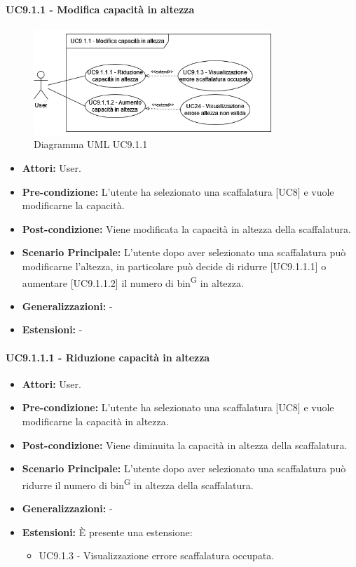 \paragraph{UC9.1.1 - Modifica capacità in altezza}
\begin{figure}[H]
  \centering
  \includegraphics[width=0.8\textwidth]{UC_diagrams_1-10/UC9.1.1.drawio.png}
   \caption{Diagramma UML UC9.1.1}
\end{figure}
\begin{itemize}
    \item \textbf{Attori:} User.
    \item \textbf{Pre-condizione:} L'utente ha selezionato una scaffalatura [UC8] e vuole modificarne la capacità.
    \item \textbf{Post-condizione:} Viene modificata la capacità in altezza della scaffalatura.
    \item \textbf{Scenario Principale:} L'utente dopo aver selezionato una scaffalatura può modificarne l'altezza, in particolare può decide di ridurre [UC9.1.1.1] o aumentare [UC9.1.1.2] il numero di bin\textsuperscript{G} in altezza.
    \item \textbf{Generalizzazioni:} -
    \item \textbf{Estensioni:} -
\end{itemize}


\paragraph{UC9.1.1.1 - Riduzione capacità in altezza}
\begin{itemize}
    \item \textbf{Attori:} User.
    \item \textbf{Pre-condizione:} L'utente ha selezionato una scaffalatura [UC8] e vuole modificarne la capacità in altezza.
    \item \textbf{Post-condizione:} Viene diminuita la capacità in altezza della scaffalatura.
    \item \textbf{Scenario Principale:} L'utente dopo aver selezionato una scaffalatura può ridurre il numero di bin\textsuperscript{G} in altezza della scaffalatura.
    \item \textbf{Generalizzazioni:} -
    \item \textbf{Estensioni:} È presente una estensione:
    \begin{itemize}
        \item UC9.1.3 - Visualizzazione errore scaffalatura occupata.
    \end{itemize}
\end{itemize}



